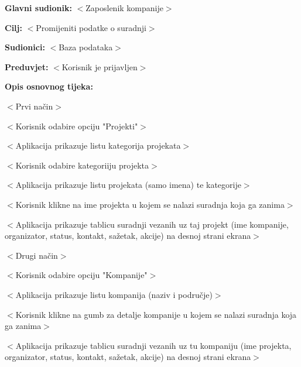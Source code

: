 					\noindent {}
					\begin{packed_item}
					
						\item \textbf{Glavni sudionik: }$<$Zaposlenik kompanije$>$
						\item  \textbf{Cilj:} $<$Promijeniti podatke o suradnji$>$
						\item  \textbf{Sudionici:} $<$Baza podataka$>$
						\item  \textbf{Preduvjet:} $<$Korisnik je prijavljen$>$
						\item  \textbf{Opis osnovnog tijeka:}
					
						\item[] \begin{packed_enum}

							\item $<$Prvi način$>$

							\item[] \begin{packed_item}

								\item $<$Korisnik odabire opciju "Projekti"$>$
								\item $<$Aplikacija prikazuje listu kategorija projekata$>$
								\item $<$Korisnik odabire kategoriiju projekta$>$
								\item $<$Aplikacija prikazuje listu projekata (samo imena) te kategorije$>$
								\item $<$Korisnik klikne na ime projekta u kojem se nalazi suradnja koja ga zanima$>$
								\item $<$Aplikacija prikazuje tablicu suradnji vezanih uz taj projekt (ime kompanije,
								organizator, status, kontakt, sažetak, akcije) na desnoj strani ekrana$>$

							\end{packed_item}

							\item $<$Drugi način$>$

							\item[] \begin{packed_item}

								\item $<$Korisnik odabire opciju "Kompanije"$>$
								\item $<$Aplikacija prikazuje listu kompanija (naziv i područje)$>$
								\item $<$Korisnik klikne na gumb za detalje kompanije u kojem se nalazi suradnja koja ga zanima$>$
								\item $<$Aplikacija prikazuje tablicu suradnji vezanih uz tu kompaniju (ime projekta,
								organizator, status, kontakt, sažetak, akcije) na desnoj strani ekrana$>$

							\end{packed_item}

						\end{packed_enum}
					\end{packed_item}

